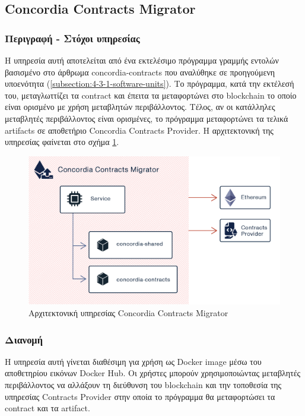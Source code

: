 \subsection{Concordia Contracts Migrator} \label{subsection:4-3-3-concordia-contracts-migrator}

\subsubsection{Περιγραφή - Στόχοι υπηρεσίας}

Η υπηρεσία αυτή αποτελείται από ένα εκτελέσιμο πρόγραμμα γραμμής εντολών βασισμένο στο άρθρωμα concordia-contracts που αναλύθηκε σε προηγούμενη υποενότητα (\ref{subsection:4-3-1-software-units}). Το πρόγραμμα, κατά την εκτέλεσή του, μεταγλωττίζει τα contract και έπειτα τα μεταφορτώνει στο blockchain το οποίο είναι ορισμένο με χρήση μεταβλητών περιβάλλοντος. Τέλος, αν οι κατάλληλες μεταβλητές περιβάλλοντος είναι ορισμένες, το πρόγραμμα μεταφορτώνει τα τελικά artifacts σε αποθετήριο Concordia Contracts Provider. Η αρχιτεκτονική της υπηρεσίας φαίνεται στο σχήμα \ref{figure:4-3-concordia-contracts-migrator-architecture}.

\vspace{.5\baselineskip}

\begin{figure}[H]
    \centering
    \includegraphics[width=.75\textwidth]{assets/figures/chapter-4/4.3.architecture-4.3.3.concordia-contracts-migrator-architecture.png}
    \caption{Αρχιτεκτονική υπηρεσίας Concordia Contracts Migrator}
    \label{figure:4-3-concordia-contracts-migrator-architecture}
\end{figure}

\subsubsection{Διανομή}

Η υπηρεσία αυτή γίνεται διαθέσιμη για χρήση ως Docker image μέσω του αποθετηρίου εικόνων Docker Hub. Οι χρήστες μπορούν χρησιμοποιώντας μεταβλητές περιβάλλοντος να αλλάξουν τη διεύθυνση του blockchain και την τοποθεσία της υπηρεσίας Contracts Provider στην οποία το πρόγραμμα θα μεταφορτώσει τα contract και τα artifact.